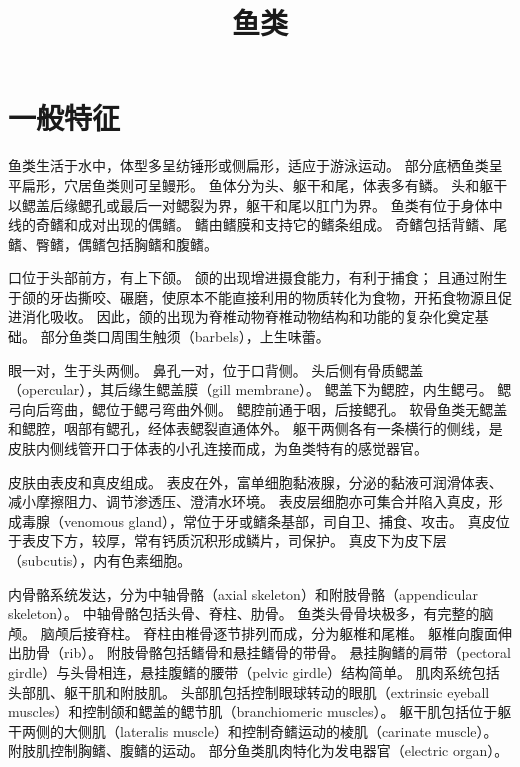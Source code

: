 \documentclass[11pt]{article}
\title{鱼类}
\date{}
\begin{document}
  \maketitle

  \linenumbers
  
\section{一般特征}
鱼类生活于水中，体型多呈纺锤形或侧扁形，适应于游泳运动。
部分底栖鱼类呈平扁形，穴居鱼类则可呈鳗形。
鱼体分为头、躯干和尾，体表多有鳞。
头和躯干以鳃盖后缘鳃孔或最后一对鳃裂为界，躯干和尾以肛门为界。
鱼类有位于身体中线的奇鳍和成对出现的偶鳍。
鳍由鳍膜和支持它的鳍条组成。
奇鳍包括背鳍、尾鳍、臀鳍，偶鳍包括胸鳍和腹鳍。

\newline

口位于头部前方，有上下颌。
颌的出现增进摄食能力，有利于捕食；
且通过附生于颌的牙齿撕咬、碾磨，使原本不能直接利用的物质转化为食物，开拓食物源且促进消化吸收。
因此，颌的出现为脊椎动物脊椎动物结构和功能的复杂化奠定基础。
部分鱼类口周围生触须（barbels），上生味蕾。

\newline

眼一对，生于头两侧。
鼻孔一对，位于口背侧。
头后侧有骨质鳃盖（opercular），其后缘生鳃盖膜（gill membrane）。
鳃盖下为鳃腔，内生鳃弓。
鳃弓向后弯曲，鳃位于鳃弓弯曲外侧。
鳃腔前通于咽，后接鳃孔。
软骨鱼类无鳃盖和鳃腔，咽部有鳃孔，经体表鳃裂直通体外。
躯干两侧各有一条横行的侧线，是皮肤内侧线管开口于体表的小孔连接而成，为鱼类特有的感觉器官。

\newline

皮肤由表皮和真皮组成。
表皮在外，富单细胞黏液腺，分泌的黏液可润滑体表、减小摩擦阻力、调节渗透压、澄清水环境。
表皮层细胞亦可集合并陷入真皮，形成毒腺（venomous gland），常位于牙或鳍条基部，司自卫、捕食、攻击。
真皮位于表皮下方，较厚，常有钙质沉积形成鳞片，司保护。
真皮下为皮下层（subcutis），内有色素细胞。

\newline

内骨骼系统发达，分为中轴骨骼（axial skeleton）和附肢骨骼（appendicular skeleton）。
中轴骨骼包括头骨、脊柱、肋骨。
鱼类头骨骨块极多，有完整的脑颅。
脑颅后接脊柱。
脊柱由椎骨逐节排列而成，分为躯椎和尾椎。
躯椎向腹面伸出肋骨（rib）。
附肢骨骼包括鳍骨和悬挂鳍骨的带骨。
悬挂胸鳍的肩带（pectoral girdle）与头骨相连，悬挂腹鳍的腰带（pelvic girdle）结构简单。
肌肉系统包括头部肌、躯干肌和附肢肌。
头部肌包括控制眼球转动的眼肌（extrinsic eyeball muscles）和控制颌和鳃盖的鳃节肌（branchiomeric muscles）。
躯干肌包括位于躯干两侧的大侧肌（lateralis muscle）和控制奇鳍运动的棱肌（carinate muscle）。
附肢肌控制胸鳍、腹鳍的运动。
部分鱼类肌肉特化为发电器官（electric organ）。
\end{document}
